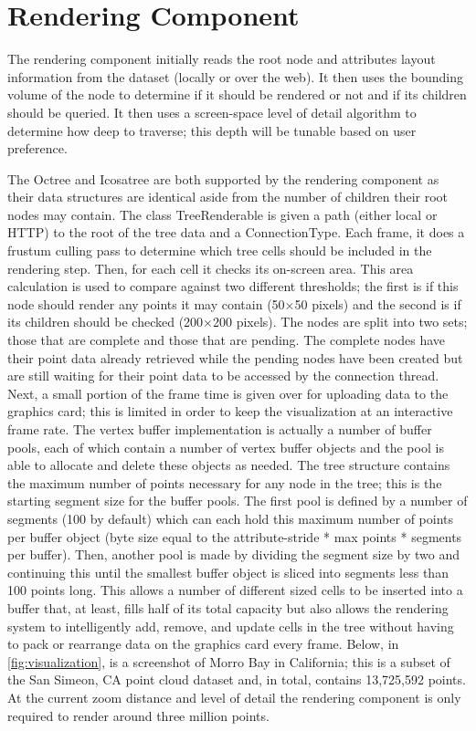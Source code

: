 \section{Rendering Component}

The rendering component initially reads the root node and attributes layout
information from the dataset (locally or over the web). It then uses the
bounding volume of the node to determine if it should be rendered or not and if
its children should be queried. It then uses a screen-space level of detail
algorithm to determine how deep to traverse; this depth will be tunable based on
user preference.

The Octree and Icosatree are both supported by the rendering component as their
data structures are identical aside from the number of children their root nodes
may contain. The class TreeRenderable is given a path (either local or HTTP) to
the root of the tree data and a ConnectionType.  Each frame, it does a frustum
culling pass to determine which tree cells should be included in the rendering
step. Then, for each cell it checks its on-screen area. This area calculation is
used to compare against two different thresholds; the first is if this node
should render any points it may contain (50×50 pixels) and the second is if its
children should be checked (200×200 pixels). The nodes are split into two sets;
those that are complete and those that are pending. The complete nodes have
their point data already retrieved while the pending nodes have been created but
are still waiting for their point data to be accessed by the connection thread.
Next, a small portion of the frame time is given over for uploading data to the
graphics card; this is limited in order to keep the visualization at an
interactive frame rate. The vertex buffer implementation is actually a number of
buffer pools, each of which contain a number of vertex buffer objects and the
pool is able to allocate and delete these objects as needed. The tree structure
contains the maximum number of points necessary for any node in the tree; this
is the starting segment size for the buffer pools. The first pool is defined by
a number of segments (100 by default) which can each hold this maximum number of
points per buffer object (byte size equal to the attribute-stride * max points *
segments per buffer). Then, another pool is made by dividing the segment size by
two and continuing this until the smallest buffer object is sliced into segments
less than 100 points long. This allows a number of different sized cells to be
inserted into a buffer that, at least, fills half of its total capacity but also
allows the rendering system to intelligently add, remove, and update cells in
the tree without having to pack or rearrange data on the graphics card every
frame. Below, in \ref{fig:visualization}, is a screenshot of Morro Bay in California; this
is a subset of the San Simeon, CA point cloud dataset and, in total, contains
13,725,592 points. At the current zoom distance and level of detail the
rendering component is only required to render around three million points.

